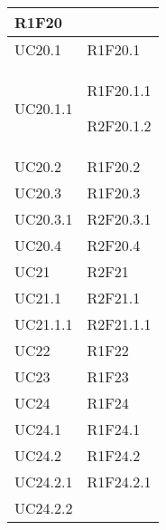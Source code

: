 \begin{center}
\begin{longtable}{|p{44mm}|p{22mm}|}
R1F20 \newline
\\
\hline
UC20.1 &

R1F20.1 \newline
\\
\hline
UC20.1.1 &

R1F20.1.1 \newline

R2F20.1.2 \newline
\\
\hline
UC20.2 &

R1F20.2 \newline
\\
\hline
UC20.3 &

R1F20.3 \newline
\\
\hline
UC20.3.1 &

R2F20.3.1 \newline
\\
\hline
UC20.4 &

R2F20.4 \newline
\\
\hline
UC21 &

R2F21 \newline
\\
\hline
UC21.1 &

R2F21.1 \newline
\\
\hline
UC21.1.1 &

R2F21.1.1 \newline
\\
\hline
UC22 &

R1F22 \newline
\\
\hline
UC23 &

R1F23 \newline
\\
\hline
UC24 &

R1F24 \newline
\\
\hline
UC24.1 &

R1F24.1 \newline
\\
\hline
UC24.2 &

R1F24.2 \newline
\\
\hline
UC24.2.1 &

R1F24.2.1 \newline
\\
\hline
UC24.2.2 &


\end{longtable}
\end{center}
